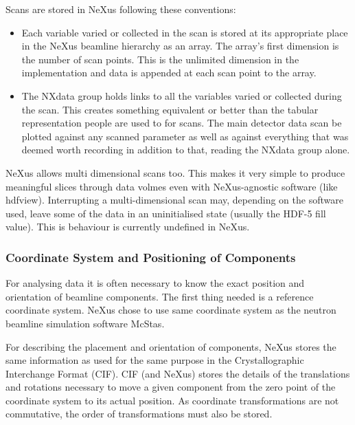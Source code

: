 \documentclass[%
 aip,
rsi,
 amsmath,amssymb,
 reprint,%
]{revtex4-1}
\begin{document}
Scans are stored in NeXus following these conventions: 
\begin{itemize}
\item Each variable varied or collected in the scan is stored at its appropriate place in the NeXus beamline 
 hierarchy as an array. The array's first dimension is the number of scan points. This is the unlimited dimension in 
 the implementation and data is appended at each scan point to the array. 
\item The NXdata group holds links to all the variables varied or collected during the scan. 
 This creates something equivalent or better than the tabular representation people are used to for scans. 
 The main detector data scan be plotted against any scanned parameter as well as against everything that was 
 deemed worth recording in addition to that, reading the NXdata group alone. 
\end{itemize}

NeXus allows multi dimensional scans too. This makes it very simple to produce meaningful slices through data 
volmes even with NeXus-agnostic software (like hdfview). Interrupting a multi-dimensional scan may, depending 
on the software used, leave some of the data in an uninitialised state (usually the HDF-5 fill value). 
This is behaviour is currently undefined in NeXus.

\subsubsection{Coordinate System and Positioning of Components}

For analysing data it is often necessary to know the exact position and orientation of beamline components. 
The first thing needed is a reference coordinate system. NeXus chose to use same coordinate system as the 
neutron beamline simulation software McStas\cite{mcstas}. 

For describing the placement and orientation of components, NeXus stores the same information as used for the 
same purpose in the Crystallographic Interchange Format (CIF)\cite{ITCVG}. CIF (and NeXus) stores the details 
of the translations and rotations necessary to move a given component from the zero point of the coordinate 
system to its actual position. As coordinate transformations are not commutative, the order of transformations 
must also be stored.
\end{document}
